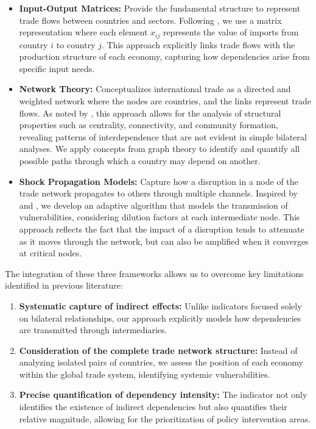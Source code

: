 \documentclass[final,1p,times,authoryear]{elsarticle}
\begin{document}
\begin{itemize}
    \item \textbf{Input-Output Matrices:} Provide the fundamental structure to represent trade flows between countries and sectors. Following \citet{MillerBlair2009}, we use a matrix representation where each element $x_{ij}$ represents the value of imports from country $i$ to country $j$. This approach explicitly links trade flows with the production structure of each economy, capturing how dependencies arise from specific input needs.

    \item \textbf{Network Theory:} Conceptualizes international trade as a directed and weighted network where the nodes are countries, and the links represent trade flows. As noted by \citet{Fagiolo2010}, this approach allows for the analysis of structural properties such as centrality, connectivity, and community formation, revealing patterns of interdependence that are not evident in simple bilateral analyses. We apply concepts from graph theory to identify and quantify all possible paths through which a country may depend on another.

    \item \textbf{Shock Propagation Models:} Capture how a disruption in a node of the trade network propagates to others through multiple channels. Inspired by \citet{Bierkandt2014} and \citet{Cerina2015}, we develop an adaptive algorithm that models the transmission of vulnerabilities, considering dilution factors at each intermediate node. This approach reflects the fact that the impact of a disruption tends to attenuate as it moves through the network, but can also be amplified when it converges at critical nodes.
\end{itemize}

The integration of these three frameworks allows us to overcome key limitations identified in previous literature:

\begin{enumerate}
    \item \textbf{Systematic capture of indirect effects:} Unlike indicators focused solely on bilateral relationships, our approach explicitly models how dependencies are transmitted through intermediaries.

    \item \textbf{Consideration of the complete trade network structure:} Instead of analyzing isolated pairs of countries, we assess the position of each economy within the global trade system, identifying systemic vulnerabilities.

    \item \textbf{Precise quantification of dependency intensity:} The indicator not only identifies the existence of indirect dependencies but also quantifies their relative magnitude, allowing for the prioritization of policy intervention areas.
\end{enumerate}
\end{document}
